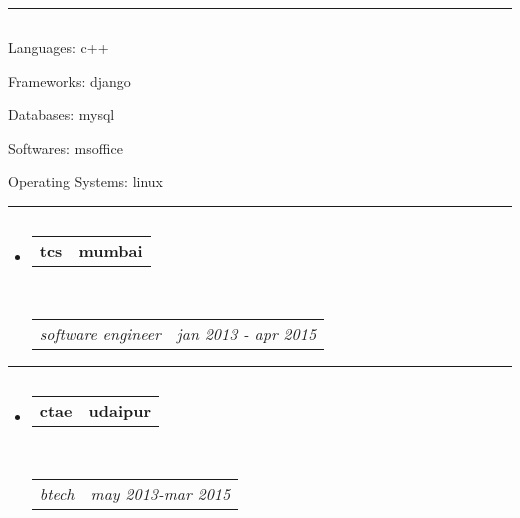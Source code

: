\documentclass[11pt, letterpaper]{article}
\makeatletter
\newenvironment{indentsection}[1]%
{\begin{list}{}%
	{\setlength{\leftmargin}{ #1 } }%
	\item[]%
}
{\end{list}}
\newcommand{\splitrow}[2]
{\begin{tabular*}{\linewidth}{l@{\extracolsep{\fill}}r}
	#1 &
	#2 \\
\end{tabular*}}
\makeatother
\begin{document}
\begin{center}

{\Huge \textsc{  }}


\\

\end{center}

\hrule
\vspace{-0.4em}
\subsection*{}

\begin{indentsection}{\parindent}
\begin{description*}
	\item[Languages:]
	c++\item[Frameworks:]
	django\item[Databases:]
	mysql\item[Softwares:]
	msoffice\item[Operating Systems:]
	linux
\end{description*}
\end{indentsection}

\hrule
\vspace{-0.4em}
\subsection*{}

\begin{itemize}
	\parskip=0.1em


	\item
      \splitrow{\textbf{ tcs }}{\textbf{ mumbai }}\\
    \splitrow
		{\emph{ software engineer }}
		{\emph{ jan 2013 - apr 2015 }}
    

\end{itemize}


\hrule
\vspace{-0.4em}
\subsection*{}

\begin{itemize}
	\parskip=0.1em

	\item 
	\splitrow
		{\textbf{ ctae }}
		{\textbf{ udaipur }}
	\\
	\splitrow
		{\emph{ btech }}
		{\emph{ may 2013-mar 2015 }}

\end{itemize}
\end{document}
